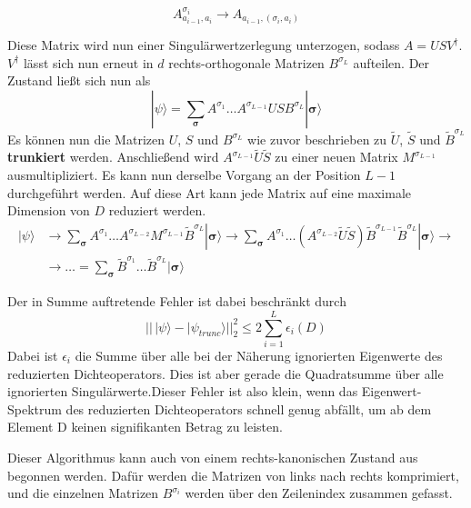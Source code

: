 \documentclass[10pt,a4paper]{report}
\begin{document}
\begin{equation}
A_{a_{i-1},a_i}^{\sigma_i}\rightarrow A_{a_{i-1},(\sigma_i,a_i)}
\end{equation}

Diese Matrix wird nun einer Singulärwertzerlegung unterzogen, sodass $A=USV^\dagger$. $V^\dagger$ lässt sich nun erneut in $d$ rechts-orthogonale Matrizen $B^{\sigma_L}$ aufteilen. Der Zustand ließt sich nun als
\begin{equation}
|\psi\rangle=\sum_{\bm{\sigma}}A^{\sigma_1}\ldots A^{\sigma_{L-1}}USB^{\sigma_L}|\bm{\sigma}\rangle
\end{equation}
Es können nun die Matrizen $U$, $S$ und $B^{\sigma_L}$ wie zuvor beschrieben zu $\tilde{U}$, $\tilde{S}$ und $\tilde{B}^{\sigma_L}$ \textbf{trunkiert} werden. Anschließend wird $A^{\sigma_{L-1}}\tilde{U}\tilde{S}$ zu einer neuen Matrix $M^{\sigma_{L-1}}$ ausmultipliziert. Es kann nun derselbe Vorgang an der Position $L-1$ durchgeführt werden. Auf diese Art kann jede  Matrix auf eine maximale Dimension von $D$ reduziert werden.
\begin{equation}
\begin{split}
|\psi\rangle&\rightarrow \sum_{\bm{\sigma}}A^{\sigma_1}\ldots A^{\sigma_{L-2}}M^{\sigma_{L-1}}\tilde{B}^{\sigma_L}|\bm{\sigma}\rangle\rightarrow \sum_{\bm{\sigma}}A^{\sigma_1}\ldots (A^{\sigma_{L-2}}\tilde{U}\tilde{S})\tilde{B}^{\sigma_{L-1}}\tilde{B}^{\sigma_L}|\bm{\sigma}\rangle\rightarrow\\
&\rightarrow \ldots=\sum_{\bm{\sigma}}\tilde{B}^{\sigma_1}\ldots \tilde{B}^{\sigma_{L}}|\bm{\sigma}\rangle
\end{split}
\end{equation}

Der in Summe auftretende Fehler ist dabei beschränkt durch
\begin{equation}
||\,|\psi\rangle-|\psi_{trunc}\rangle||_2^2\leq 2\sum_{i=1}^{L}\epsilon_i(D)
\end{equation}
Dabei ist $\epsilon_i$ die Summe über alle bei der Näherung ignorierten Eigenwerte des reduzierten Dichteoperators. Dies ist aber gerade die Quadratsumme über alle ignorierten Singulärwerte.Dieser Fehler ist also klein, wenn das Eigenwert-Spektrum des reduzierten Dichteoperators schnell genug abfällt, um ab dem Element D keinen signifikanten Betrag zu leisten. 

Dieser Algorithmus kann auch von einem rechts-kanonischen Zustand aus begonnen werden. Dafür werden die Matrizen von links nach rechts komprimiert, und die einzelnen Matrizen $B^{\sigma_i}$ werden über den Zeilenindex zusammen gefasst.
\end{document}
